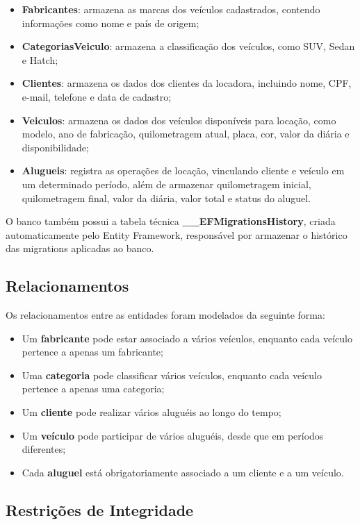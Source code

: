 \documentclass[12pt]{article}
\begin{document}
\begin{itemize}
\item \textbf{Fabricantes}: armazena as marcas dos veículos cadastrados, contendo informações como nome e país de origem;
\item \textbf{CategoriasVeiculo}: armazena a classificação dos veículos, como SUV, Sedan e Hatch;
\item \textbf{Clientes}: armazena os dados dos clientes da locadora, incluindo nome, CPF, e-mail, telefone e data de cadastro;
\item \textbf{Veiculos}: armazena os dados dos veículos disponíveis para locação, como modelo, ano de fabricação, quilometragem atual, placa, cor, valor da diária e disponibilidade;
\item \textbf{Alugueis}: registra as operações de locação, vinculando cliente e veículo em um determinado período, além de armazenar quilometragem inicial, quilometragem final, valor da diária, valor total e status do aluguel.
\end{itemize}

O banco também possui a tabela técnica \textbf{\_\_EFMigrationsHistory}, criada automaticamente pelo Entity Framework, responsável por armazenar o histórico das migrations aplicadas ao banco.

\subsection{Relacionamentos}

Os relacionamentos entre as entidades foram modelados da seguinte forma:

\begin{itemize}
\item Um \textbf{fabricante} pode estar associado a vários veículos, enquanto cada veículo pertence a apenas um fabricante;
\item Uma \textbf{categoria} pode classificar vários veículos, enquanto cada veículo pertence a apenas uma categoria;
\item Um \textbf{cliente} pode realizar vários aluguéis ao longo do tempo;
\item Um \textbf{veículo} pode participar de vários aluguéis, desde que em períodos diferentes;
\item Cada \textbf{aluguel} está obrigatoriamente associado a um cliente e a um veículo.
\end{itemize}

\subsection{Restrições de Integridade}
\end{document}
